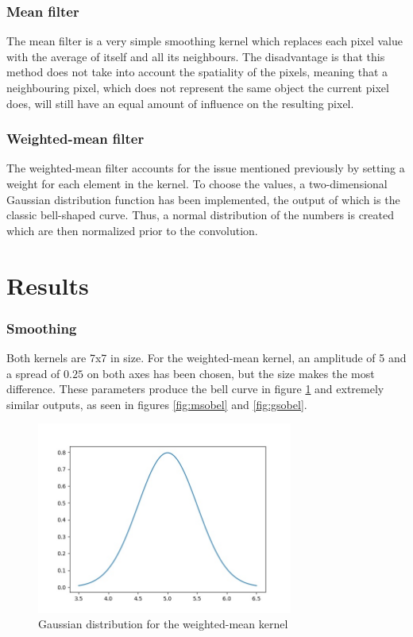 \documentclass[12pt,a4paper]{article}
\begin{document}
\subsubsection*{Mean filter}

The mean filter is a very simple smoothing kernel which replaces each pixel value with the average of itself and all its neighbours. The disadvantage is that this method does not take into account the spatiality of the pixels, meaning that a neighbouring pixel, which does not represent the same object the current pixel does, will still have an equal amount of influence on the resulting pixel.

\subsubsection*{Weighted-mean filter}

The weighted-mean filter accounts for the issue mentioned previously by setting a weight for each element in the kernel. To choose the values, a two-dimensional Gaussian distribution function has been implemented, the output of which is the classic bell-shaped curve. Thus, a normal distribution of the numbers is created which are then normalized prior to the convolution.

\section*{Results}

\subsubsection*{Smoothing}

Both kernels are 7x7 in size. For the weighted-mean kernel, an amplitude of 5 and a spread of $0.25$ on both axes has been chosen, but the size makes the most difference. These parameters produce the bell curve in figure \ref{fig:bell} and extremely similar outputs, as seen in figures \ref{fig:msobel} and \ref{fig:gsobel}.

\begin{figure}[ht]
    \centering
    \includegraphics[width=0.75\textwidth]{bell}
    \caption{Gaussian distribution for the weighted-mean kernel}
    \label{fig:bell}
\end{figure}
\end{document}
